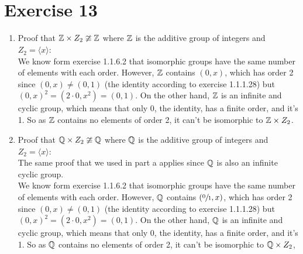 \documentclass[12pt]{article}
\begin{document}
    \section*{Exercise 13}
    \begin{enumerate}[label=\textbf{\alph*.}]
        \item 
            Proof that $\mathbb{Z} \times Z_2 \ncong \mathbb{Z}$
            where $\mathbb{Z}$ is the additive group of integers
            and $Z_2 = \langle x \rangle$: \\
            We know form exercise 1.1.6.2 that isomorphic
            groups have the same number of elements with each order.
            However, $\mathbb{Z}$ contains $(0, x)$, which has order 2
            since $(0, x) \neq (0, 1)$
            (the identity according to exercise 1.1.1.28)
            but $(0, x)^2 = (2 \cdot 0, x^2) = (0, 1)$.
            On the other hand, $\mathbb{Z}$ is an infinite and cyclic
            group, which means that only 0, the identity,
            has a finite order, and it's 1.
            So as $\mathbb{Z}$ contains no elements of order 2,
            it can't be isomorphic to $\mathbb{Z} \times Z_2$.
        \item
            Proof that $\mathbb{Q} \times Z_2 \ncong \mathbb{Q}$
            where $\mathbb{Q}$ is the additive group of integers
            and $Z_2 = \langle x \rangle$: \\
            The same proof that we used in part a applies
            since $\mathbb{Q}$ is also an infinite cyclic group. \\
            We know form exercise 1.1.6.2 that isomorphic
            groups have the same number of elements with each order.
            However, $\mathbb{Q}$ contains $(\sfrac{0}{1}, x)$,
            which has order 2
            since $(0, x) \neq (0, 1)$
            (the identity according to exercise 1.1.1.28)
            but $(0, x)^2 = (2 \cdot 0, x^2) = (0, 1)$.
            On the other hand, $\mathbb{Q}$ is an infinite and cyclic
            group, which means that only 0, the identity,
            has a finite order, and it's 1.
            So as $\mathbb{Q}$ contains no elements of order 2,
            it can't be isomorphic to $\mathbb{Q} \times Z_2$,
    \end{enumerate}
\end{document}
